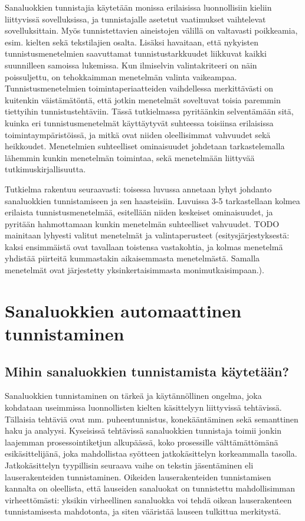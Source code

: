 \documentclass[utf8,bachelor,manualbib]{gradu3}
\begin{document}
Sanaluokkien tunnistajia käytetään monissa erilaisissa luonnollisiin kieliin liittyvissä sovelluksissa, ja tunnistajalle asetetut vaatimukset vaihtelevat sovelluksittain. Myös tunnistettavien aineistojen välillä on valtavasti poikkeamia, esim. kielten sekä tekstilajien osalta. Lisäksi havaitaan, että nykyisten tunnistusmenetelmien saavuttamat tunnistustarkkuudet liikkuvat kaikki suunnilleen samoissa lukemissa. Kun ilmiselvin valintakriteeri on näin poissuljettu, on tehokkaimman menetelmän valinta vaikeampaa. Tunnistusmenetelmien toimintaperiaatteiden vaihdellessa merkittävästi on kuitenkin väistämätöntä, että jotkin menetelmät soveltuvat toisia paremmin tiettyihin tunnistustehtäviin. Tässä tutkielmassa pyritäänkin selventämään sitä, kuinka eri tunnistusmenetelmät käyttäytyvät suhteessa toisiinsa erilaisissa toimintaympäristöissä, ja mitkä ovat niiden oleellisimmat vahvuudet sekä heikkoudet. Menetelmien suhteelliset ominaisuudet johdetaan tarkastelemalla lähemmin kunkin menetelmän toimintaa, sekä menetelmään liittyvää tutkimuskirjallisuutta. 

Tutkielma rakentuu seuraavasti: toisessa luvussa annetaan lyhyt johdanto sanaluokkien tunnistamiseen ja sen haasteisiin. Luvuissa 3-5 tarkastellaan kolmea erilaista tunnistusmenetelmää, esitellään niiden keskeiset ominaisuudet, ja pyritään hahmottamaan kunkin menetelmän suhteelliset vahvuudet. TODO mainitaan lyhyesti valitut menetelmät ja valintaperusteet (esitysjärjestyksestä: kaksi ensimmäistä ovat tavallaan toistensa vastakohtia, ja kolmas menetelmä yhdistää piirteitä kummastakin aikaisemmasta menetelmästä. Samalla menetelmät ovat järjestetty yksinkertaisimmasta monimutkaisimpaan.).


\chapter{Sanaluokkien automaattinen tunnistaminen}

\section{Mihin sanaluokkien tunnistamista käytetään?}

Sanaluokkien tunnistaminen on tärkeä ja käytännöllinen ongelma, joka kohdataan useimmissa luonnollisten kielten käsittelyyn liittyvissä tehtävissä. Tällaisia tehtäviä ovat mm. puheentunnistus, konekääntäminen sekä semanttinen haku ja analyysi. Kyseisissä tehtävissä sanaluokkien tunnistaja toimii jonkin laajemman prosessointiketjun alkupäässä, koko prosessille välttämättömänä esikäsittelijänä, joka mahdollistaa syötteen jatkokäsittelyn korkeammalla tasolla. Jatkokäsittelyn tyypillisin seuraava vaihe on tekstin jäsentäminen eli lauserakenteiden tunnistaminen. Oikeiden lauserakenteiden tunnistamisen kannalta on oleellista, että lauseiden sanaluokat on tunnistettu mahdollisimman virheettömästi: yksikin virheellinen sanaluokka voi tehdä oikean lauserakenteen tunnistamisesta mahdotonta, ja siten vääristää lauseen tulkittua merkitystä.
\end{document}
